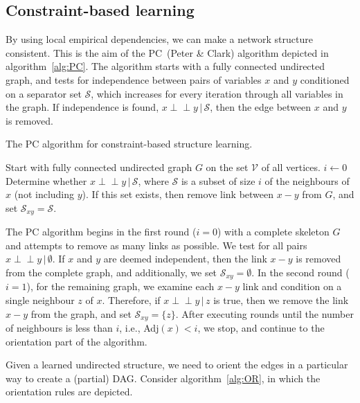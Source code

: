 \documentclass{article}
\newcommand{\giv}{\,|\,}
\newcommand{\indep}{\perp \!\!\! \perp}
\begin{document}
\subsection{Constraint-based learning}

By using local empirical dependencies, we can make a network structure consistent. This is the aim of the PC~(Peter \& Clark) algorithm depicted in algorithm~\ref{alg:PC}. The algorithm starts with a fully connected undirected graph, and tests for independence between pairs of variables $x$ and $y$ conditioned on a separator set $\mathcal{S}$, which increases for every iteration through all variables in the graph. If independence is found, $x \indep y \giv \mathcal{S}$, then the edge between $x$ and $y$ is removed. 

\begin{algorithm}
\caption{The PC algorithm for constraint-based structure learning. }\label{alg:PC}
\begin{algorithmic}[1]
\State Start with fully connected undirected graph $G$ on the set $\mathcal{V}$ of all vertices. 
\State $i \gets 0$
\Repeat
            \State Determine whether $x \indep y \giv \mathcal{S}$, where $\mathcal{S}$ \State is a subset of size $i$ of the neighbours of $x$ (not including $y$). \State If this set exists, then remove link between $x - y$ from $G$, and set \State $\mathcal{S}_{xy} = \mathcal{S}$.  
        \EndFor
    \EndFor
{}
\end{algorithmic}
\end{algorithm}

\noindent The PC algorithm begins in the first round ($i = 0$) with a complete skeleton $G$ and attempts to remove as many links as possible. We test for all pairs $x \indep y \giv \emptyset$. If $x$ and $y$ are deemed independent, then the link $x - y$ is removed from the complete graph, and additionally, we set $\mathcal{S}_{xy} = \emptyset$. In the second round ($i = 1$), for the remaining graph, we examine each $x - y$ link and condition on a single neighbour $z$ of $x$. Therefore, if $x \indep y \giv z$ is true, then we remove the link $x - y$ from the graph, and set $\mathcal{S}_{xy} = \{z\}$. After executing rounds until the number of neighbours is less than $i$, i.e., Adj$(x) < i$, we stop, and continue to the orientation part of the algorithm. 

Given a learned undirected structure, we need to orient the edges in a particular way to create a (partial) DAG. Consider algorithm~\ref{alg:OR}, in which the orientation rules are depicted.  
\end{document}
